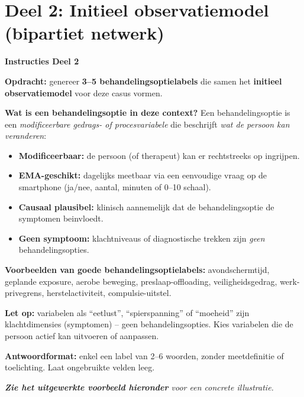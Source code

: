 \documentclass[11pt,a4paper]{article}
\begin{document}
\vspace{0.6em}

\newpage


\section{Deel 2: Initieel observatiemodel (bipartiet netwerk)}

\begin{tcolorbox}[colback=green!3,colframe=ForestGreen,arc=2.5mm,boxrule=0.9pt,
  left=10pt,right=10pt,top=9pt,bottom=9pt]
\textbf{\color{ForestGreen}Instructies Deel 2}

\smallskip\small
\textbf{Opdracht:} genereer \textbf{3--5 behandelingsoptielabels} die samen het
\textbf{initieel observatiemodel} voor deze casus vormen.

\textbf{Wat is een behandelingsoptie in deze context?}
Een behandelingsoptie is een \emph{modificeerbare gedrags- of procesvariabele} die beschrijft
\emph{wat de persoon kan veranderen}:
\begin{itemize}[topsep=2pt,itemsep=1pt]
\item \textbf{Modificeerbaar:} de persoon (of therapeut) kan er rechtstreeks op ingrijpen.
\item \textbf{EMA-geschikt:} dagelijks meetbaar via een eenvoudige vraag op de smartphone
(ja/nee, aantal, minuten of 0--10 schaal).
\item \textbf{Causaal plausibel:} klinisch aannemelijk dat de behandelingsoptie de symptomen beinvloedt.
\item \textbf{Geen symptoom:} klachtniveaus of diagnostische trekken zijn
\emph{geen} behandelingsopties.
\end{itemize}

\textbf{Voorbeelden van goede behandelingsoptielabels:}
avondschermtijd, geplande exposure, aerobe beweging, preslaap-offloading,
veiligheidsgedrag, werk-privegrens, herstelactiviteit, compulsie-uitstel.

\textbf{Let op:} variabelen als ``eetlust'', ``spierspanning'' of ``moeheid'' zijn
klachtdimensies (symptomen) -- geen behandelingsopties. Kies variabelen die de persoon
actief kan uitvoeren of aanpassen.

\textbf{Antwoordformat:} enkel een label van 2--6 woorden, zonder meetdefinitie of toelichting.
Laat ongebruikte velden leeg.

\medskip
\textit{\textbf{Zie het uitgewerkte voorbeeld hieronder} voor een concrete illustratie.}
\end{tcolorbox}
\end{document}
